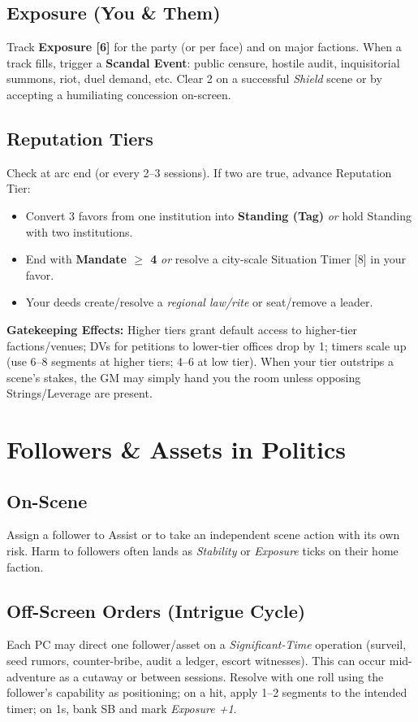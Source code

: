 \documentclass[11pt]{article}
\begin{document}
\subsection{Exposure (You \& Them)}
Track \textbf{Exposure [6]} for the party (or per face) and on major factions. When a track fills, trigger a \textbf{Scandal Event}: public censure, hostile audit, inquisitorial summons, riot, duel demand, etc. Clear 2 on a successful \emph{Shield} scene or by accepting a humiliating concession on-screen.

\subsection{Reputation Tiers}
Check at arc end (or every 2--3 sessions). If two are true, advance Reputation Tier:
\begin{itemize}
  \item Convert 3 favors from one institution into \textbf{Standing (Tag)} \emph{or} hold Standing with two institutions.
  \item End with \textbf{Mandate $\geq$ 4} \emph{or} resolve a city-scale Situation Timer [8] in your favor.
  \item Your deeds create/resolve a \emph{regional law/rite} or seat/remove a leader.
\end{itemize}
\textbf{Gatekeeping Effects:} Higher tiers grant default access to higher-tier factions/venues; DVs for petitions to lower-tier offices drop by 1; timers scale up (use 6--8 segments at higher tiers; 4--6 at low tier). When your tier outstrips a scene's stakes, the GM may simply hand you the room unless opposing Strings/Leverage are present.

\section{Followers \& Assets in Politics}
\subsection*{On-Scene}
Assign a follower to Assist or to take an independent scene action with its own risk. Harm to followers often lands as \emph{Stability} or \emph{Exposure} ticks on their home faction.

\subsection*{Off-Screen Orders (Intrigue Cycle)}
Each PC may direct one follower/asset on a \emph{Significant-Time} operation (surveil, seed rumors, counter-bribe, audit a ledger, escort witnesses). This can occur mid-adventure as a cutaway or between sessions. Resolve with one roll using the follower's capability as positioning; on a hit, apply 1--2 segments to the intended timer; on 1s, bank SB and mark \emph{Exposure +1}.
\end{document}
